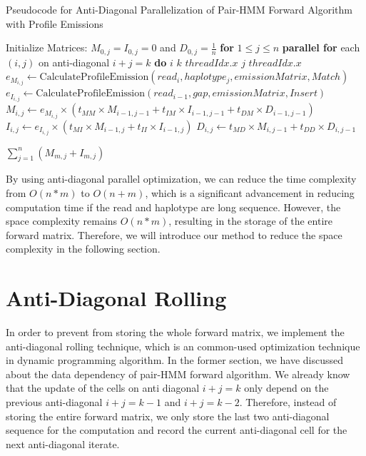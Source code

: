 \documentclass[PhD]{PHlab-thesis}
\begin{document}
\begin{algorithm}[h]
\caption{Pseudocode for Anti-Diagonal Parallelization of Pair-HMM Forward Algorithm with Profile Emissions}
\begin{algorithmic}[1]
\State Initialize Matrices: $M_{0,j} = I_{0,j} = 0$ and $D_{0,j} = \frac{1}{n}$ \textbf{for} $1 \leq j \leq n$
    \State \textbf{parallel for} each $(i, j)$ on anti-diagonal $i+j=k$ \textbf{do}
    \State $i$ \gets $k$ \minus $threadIdx.x$
    \State $j$ \gets $threadIdx.x$
        \State $e_{M_{i,j}} \gets \text{CalculateProfileEmission}(read_i, haplotype_j, emissionMatrix, Match)$
        \State $e_{I_{i,j}} \gets \text{CalculateProfileEmission}(read_{i-1}, gap, emissionMatrix, Insert)$
        \State $M_{i,j} \gets e_{M_{i,j}} \times (t_{MM} \times M_{i-1,j-1} + t_{IM} \times I_{i-1,j-1} + t_{DM} \times D_{i-1,j-1})$
        \State $I_{i,j} \gets e_{I_{i,j}} \times (t_{MI} \times M_{i-1,j} + t_{II} \times I_{i-1,j})$
        \State $D_{i,j} \gets t_{MD} \times M_{i,j-1} + t_{DD} \times D_{i,j-1}$
    \EndIf
\EndFor

\State \Return $\sum_{j=1}^{n} (M_{m,j} + I_{m,j})$
\EndProcedure
\end{algorithmic}
\end{algorithm}

By using anti-diagonal parallel optimization, we can reduce the time complexity from $O(n*m)$ to $O(n+m)$, which is a significant advancement in reducing computation time if the read and haplotype are long sequence. However, the space complexity remains $O(n*m)$, resulting in the storage of the entire forward matrix. Therefore, we will introduce our method to reduce the space complexity in the following section.
\newpage
\section{Anti-Diagonal Rolling}
In order to prevent from storing the whole forward matrix, we implement the anti-diagonal rolling technique, which is an common-used optimization technique in dynamic programming algorithm. In the former section, we have discussed about the data dependency of pair-HMM forward algorithm. We already know that the update of the cells on anti diagonal $i+j=k$ only depend on the previous anti-diagonal $i+j=k-1$ and $i+j=k-2$. Therefore, instead of storing the entire forward matrix, we only store the last two anti-diagonal sequence for the computation and record the current anti-diagonal cell for the next anti-diagonal iterate. 
\end{document}
